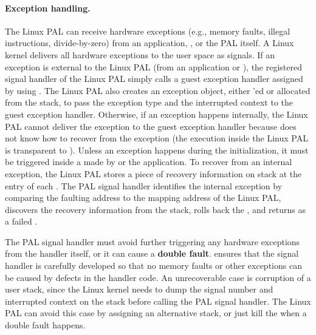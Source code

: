 \paragraph{Exception handling.}
The Linux PAL can receive hardware exceptions (e.g., memory faults, illegal instructions, divide-by-zero) from an application, \thelibos{}, or the PAL itself.
A Linux kernel delivers all hardware exceptions to the user space
as signals.
If an exception is external to the Linux PAL (from an application or \thelibos{}),
the registered signal handler of the Linux PAL simply calls
a guest exception handler assigned by \thelibos{} using .
The Linux PAL also creates an exception object, either 'ed or allocated from the stack,
to pass the exception type and the interrupted context
to the guest exception handler.
Otherwise, if an exception happens internally,
the Linux PAL cannot deliver the exception to the guest exception handler because \thelibos{} does not know how to recover from the exception (the execution inside the Linux PAL is transparent to \thelibos{}).
Unless an exception
happens during the initialization,
it must be triggered inside a \hostapi{} made by \thelibos{} or the application.
To recover from an internal exception,
the Linux PAL stores a piece of recovery information on stack
at the entry of each \hostapi{}.
The PAL signal handler
identifies the internal exception by comparing the faulting address
to the mapping address of the Linux PAL,
discovers the recovery information from the stack,
rolls back the \hostapi{},
and returns as a failed \hostapi{}.



The PAL signal handler must avoid further triggering any hardware exceptions from the handler itself, or it can cause a {\bf double fault}.
\graphene{} ensures that the signal handler is carefully developed
so that no memory faults or other exceptions
can be caused by defects in the handler code.
An unrecoverable case is corruption of a user stack,
since the Linux kernel needs to dump the signal number and interrupted context on the stack
before calling the PAL signal handler.
The Linux PAL can avoid this case by assigning an alternative stack,
or just kill the \picoproc{} when a double fault happens.







 






